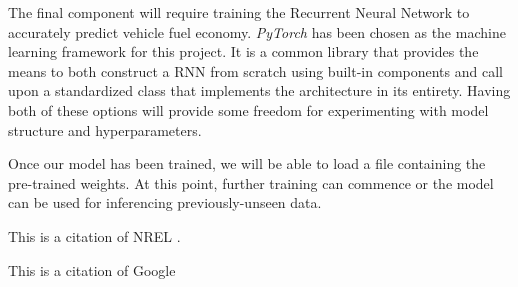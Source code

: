 \documentclass[letterpaper]{article}
\begin{document}
The final component will require training the Recurrent Neural Network to accurately predict vehicle fuel economy.
\emph{PyTorch} has been chosen as the machine learning framework for this project. It is a common library that
provides the means to both construct a RNN from scratch using built-in components and call upon a standardized class
that implements the architecture in its entirety. Having both of these options will provide some freedom for
experimenting with model structure and hyperparameters.

Once our model has been trained, we will be able to load a file containing the pre-trained weights. At this point,
further training can commence or the model can be used for inferencing previously-unseen data.



This is a citation of NREL \cite{nrel_routee}.

This is a citation of Google \cite{google_2023_environmental_report}


 

\end{document}
